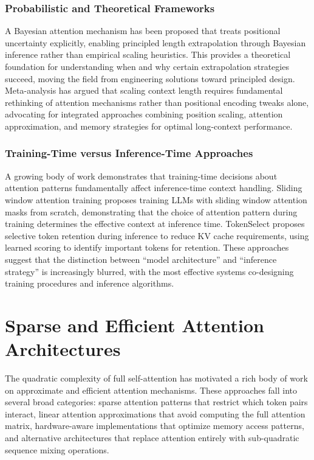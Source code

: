 \documentclass[11pt,letterpaper]{article}
\begin{document}
\subsubsection{Probabilistic and Theoretical Frameworks}

A Bayesian attention mechanism has been proposed that treats positional uncertainty explicitly, enabling principled length extrapolation through Bayesian inference rather than empirical scaling heuristics. This provides a theoretical foundation for understanding when and why certain extrapolation strategies succeed, moving the field from engineering solutions toward principled design. Meta-analysis has argued that scaling context length requires fundamental rethinking of attention mechanisms rather than positional encoding tweaks alone, advocating for integrated approaches combining position scaling, attention approximation, and memory strategies for optimal long-context performance.

\subsubsection{Training-Time versus Inference-Time Approaches}

A growing body of work demonstrates that training-time decisions about attention patterns fundamentally affect inference-time context handling. Sliding window attention training proposes training LLMs with sliding window attention masks from scratch, demonstrating that the choice of attention pattern during training determines the effective context at inference time. TokenSelect proposes selective token retention during inference to reduce KV cache requirements, using learned scoring to identify important tokens for retention. These approaches suggest that the distinction between ``model architecture'' and ``inference strategy'' is increasingly blurred, with the most effective systems co-designing training procedures and inference algorithms.


\section{Sparse and Efficient Attention Architectures}
\label{sec:sparse}

The quadratic complexity of full self-attention has motivated a rich body of work on approximate and efficient attention mechanisms. These approaches fall into several broad categories: sparse attention patterns that restrict which token pairs interact, linear attention approximations that avoid computing the full attention matrix, hardware-aware implementations that optimize memory access patterns, and alternative architectures that replace attention entirely with sub-quadratic sequence mixing operations.
\end{document}
